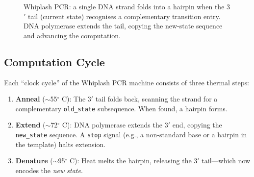 \begin{figure}[H]
\centering
{}
\caption{Whiplash PCR: a single DNA strand folds into a hairpin when the 3$'$ tail (current state) recognises a complementary transition entry.  DNA polymerase extends the tail, copying the new-state sequence and advancing the computation.}
\label{fig:whiplash-pcr}
\end{figure}

\subsection{Computation Cycle}

Each ``clock cycle'' of the Whiplash PCR machine consists of three thermal steps:

\begin{enumerate}[leftmargin=1.8em]
  \item \textbf{Anneal} ($\sim$55$^\circ$ C): The 3$'$ tail folds back, scanning the strand for a complementary \texttt{old\_state} subsequence.  When found, a hairpin forms.
  \item \textbf{Extend} ($\sim$72$^\circ$ C): DNA polymerase extends the 3$'$ end, copying the \texttt{new\_state} sequence.  A \texttt{stop} signal (e.g., a non-standard base or a hairpin in the template) halts extension.
  \item \textbf{Denature} ($\sim$95$^\circ$ C): Heat melts the hairpin, releasing the 3$'$ tail---which now encodes the \emph{new state}.
\end{enumerate}

